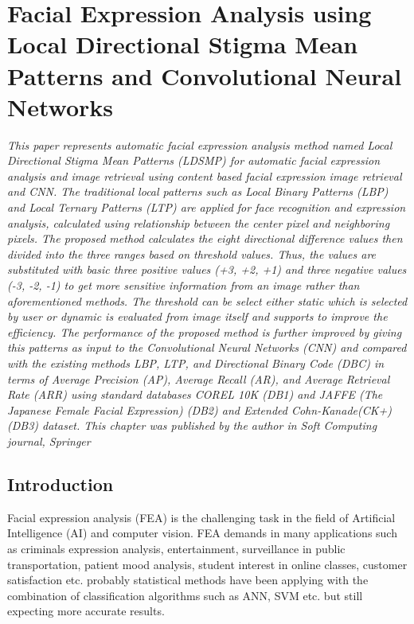 \chapter{Facial Expression Analysis using Local Directional Stigma Mean Patterns and Convolutional Neural Networks}
\label{Chapter 3:EVIMAS}
\textit{This paper represents automatic facial expression analysis method named Local Directional Stigma Mean Patterns (LDSMP) for automatic facial expression analysis and image retrieval using content based facial expression image retrieval and CNN. The traditional local patterns such as Local Binary Patterns (LBP) and Local Ternary Patterns (LTP) are applied for face recognition and expression analysis, calculated using relationship between the center pixel and neighboring pixels. The proposed method calculates the eight directional difference values then divided into the three ranges based on threshold values. Thus, the values are substituted with basic three positive values (+3, +2, +1) and three negative values (-3, -2, -1) to get more sensitive information from an image rather than aforementioned methods. The threshold can be select either static which is selected by user or dynamic is evaluated from image itself and supports to improve the efficiency. The performance of the proposed method is further improved by giving this patterns as input to the Convolutional Neural Networks (CNN) and compared with the existing methods LBP, LTP, and Directional Binary Code (DBC) in terms of Average Precision (AP), Average Recall (AR), and Average Retrieval Rate (ARR) using standard databases COREL 10K (DB1) and JAFFE (The Japanese Female Facial Expression) (DB2) and Extended Cohn-Kanade(CK+) (DB3) dataset.  This chapter was published by the author in Soft Computing journal, Springer \cite{DineshReddy2017}}



\section{Introduction}
Facial expression analysis (FEA) is the challenging task in the field of Artificial Intelligence (AI) and computer vision. FEA demands in many applications such as criminals expression analysis, entertainment, surveillance in public transportation, patient mood analysis, student interest in online classes, customer satisfaction etc. probably statistical methods have been applying with the combination of classification algorithms such as ANN, SVM etc. but still expecting more accurate results. 


